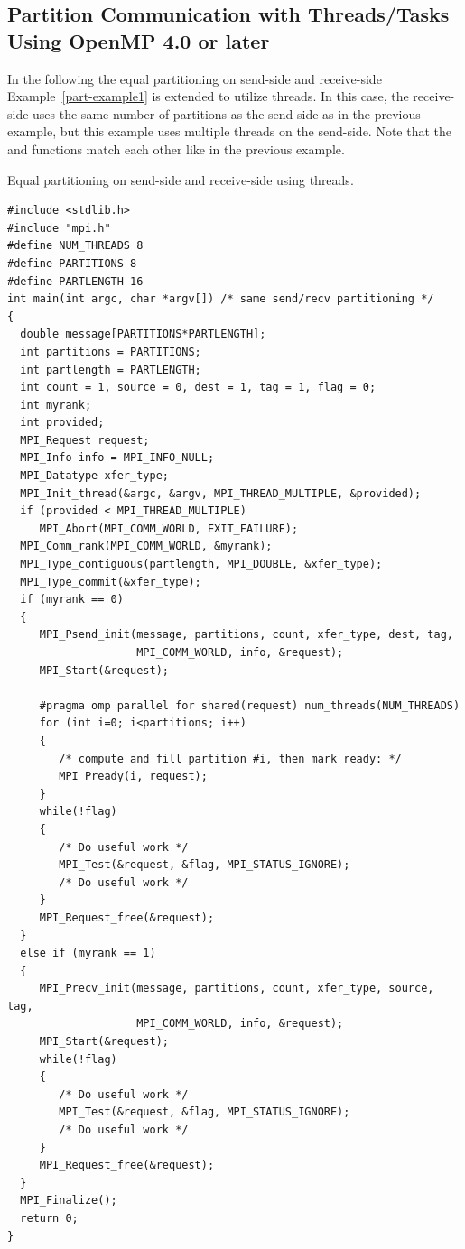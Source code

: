 \subsection{Partition Communication with Threads/Tasks Using OpenMP 4.0 or later}
\label{subsec:part-channel-examples}
In the following the equal partitioning on send-side and receive-side Example~\ref{part-example1} is extended
to utilize threads. In this case, the receive-side uses the same
number of partitions as the send-side as in the previous example, but this
example uses multiple threads on the send-side. Note that the
 and  functions match
each other like in the previous example.

\begin{example}
Equal partitioning on send-side and receive-side using threads.
\label{part-example2}%
%
%
\begin{lstlisting}[language={[MPI]C}]
#include <stdlib.h>
#include "mpi.h"
#define NUM_THREADS 8
#define PARTITIONS 8
#define PARTLENGTH 16
int main(int argc, char *argv[]) /* same send/recv partitioning */
{
  double message[PARTITIONS*PARTLENGTH];
  int partitions = PARTITIONS;
  int partlength = PARTLENGTH;
  int count = 1, source = 0, dest = 1, tag = 1, flag = 0;
  int myrank;
  int provided;
  MPI_Request request;
  MPI_Info info = MPI_INFO_NULL;
  MPI_Datatype xfer_type;
  MPI_Init_thread(&argc, &argv, MPI_THREAD_MULTIPLE, &provided);
  if (provided < MPI_THREAD_MULTIPLE)
     MPI_Abort(MPI_COMM_WORLD, EXIT_FAILURE);
  MPI_Comm_rank(MPI_COMM_WORLD, &myrank);
  MPI_Type_contiguous(partlength, MPI_DOUBLE, &xfer_type);
  MPI_Type_commit(&xfer_type);
  if (myrank == 0)
  {
     MPI_Psend_init(message, partitions, count, xfer_type, dest, tag,
                    MPI_COMM_WORLD, info, &request);
     MPI_Start(&request);

     #pragma omp parallel for shared(request) num_threads(NUM_THREADS)
     for (int i=0; i<partitions; i++)
     {
        /* compute and fill partition #i, then mark ready: */
        MPI_Pready(i, request);
     }
     while(!flag)
     {
        /* Do useful work */
        MPI_Test(&request, &flag, MPI_STATUS_IGNORE);
        /* Do useful work */
     }
     MPI_Request_free(&request);
  }
  else if (myrank == 1)
  {
     MPI_Precv_init(message, partitions, count, xfer_type, source, tag,
                    MPI_COMM_WORLD, info, &request);
     MPI_Start(&request);
     while(!flag)
     {
        /* Do useful work */
        MPI_Test(&request, &flag, MPI_STATUS_IGNORE);
        /* Do useful work */
     }
     MPI_Request_free(&request);
  }
  MPI_Finalize();
  return 0;
}
\end{lstlisting}
\end{example}

